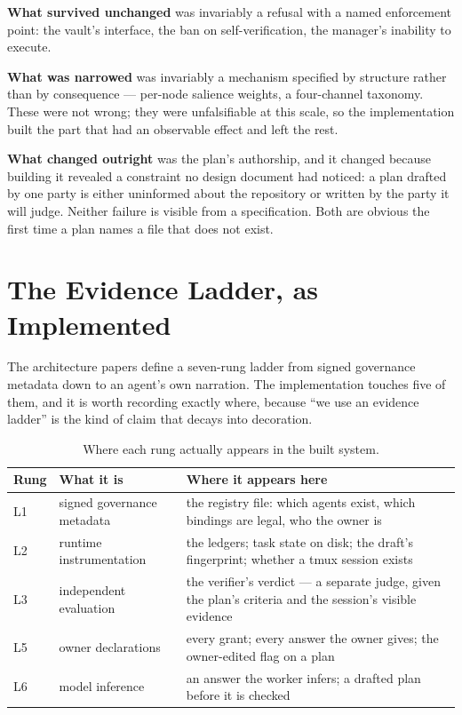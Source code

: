 \documentclass[11pt]{article}
\begin{document}
\textbf{What survived unchanged} was invariably a refusal with a named enforcement point: the vault's interface, the ban on self-verification, the manager's inability to execute.

\textbf{What was narrowed} was invariably a mechanism specified by structure rather than by consequence --- per-node salience weights, a four-channel taxonomy. These were not wrong; they were unfalsifiable at this scale, so the implementation built the part that had an observable effect and left the rest.

\textbf{What changed outright} was the plan's authorship, and it changed because building it revealed a constraint no design document had noticed: a plan drafted by one party is either uninformed about the repository or written by the party it will judge. Neither failure is visible from a specification. Both are obvious the first time a plan names a file that does not exist.

\section{The Evidence Ladder, as Implemented}
\label{sec:ladder}

The architecture papers define a seven-rung ladder from signed governance metadata down to an agent's own narration. The implementation touches five of them, and it is worth recording exactly where, because ``we use an evidence ladder'' is the kind of claim that decays into decoration.

\begin{table}[h]
\centering\small
\caption{Where each rung actually appears in the built system.}
\label{tab:ladder}
\begin{tabular}{@{}L{1.4cm}L{4.2cm}L{7.6cm}@{}}
\toprule
\textbf{Rung} & \textbf{What it is} & \textbf{Where it appears here} \\
\midrule
L1 & signed governance metadata & the registry file: which agents exist, which bindings are legal, who the owner is \\
L2 & runtime instrumentation & the ledgers; task state on disk; the draft's fingerprint; whether a tmux session exists \\
L3 & independent evaluation & the verifier's verdict --- a separate judge, given the plan's criteria and the session's visible evidence \\
L5 & owner declarations & every grant; every answer the owner gives; the owner-edited flag on a plan \\
L6 & model inference & an answer the worker infers; a drafted plan before it is checked \\
\bottomrule
\end{tabular}
\end{table}
\end{document}
